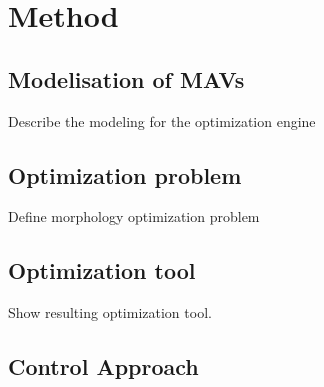 \chapter{Method}
\label{sec:method}

\section{Modelisation of MAVs}
\label{sec:modeling_mav}
Describe the modeling for the optimization engine

\section{Optimization problem}
\label{sec:optimization_problem}
Define morphology optimization problem

\section{Optimization tool}
\label{sec:optimization_tool}
Show resulting optimization tool.

\section{Control Approach}
\label{sec:control_approach}
